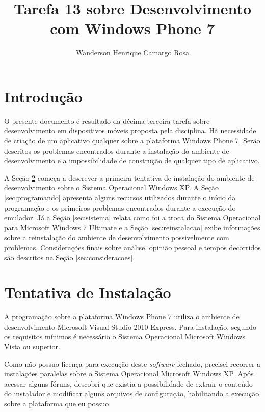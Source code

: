 \documentclass{article}
\title{Tarefa 13 sobre Desenvolvimento com Windows Phone 7}
\author{Wanderson Henrique Camargo Rosa\inst{1}}
\begin{document}
\maketitle{}

\section{Introdução}
\label{sec:introducao}

O presente documento é resultado da décima terceira tarefa sobre desenvolvimento
em dispositivos móveis proposta pela disciplina. Há necessidade de criação de um
aplicativo qualquer sobre a plataforma Windows Phone 7. Serão descritos os
problemas encontrados durante a instalação do ambiente de desenvolvimento e a
impossibilidade de construção de qualquer tipo de aplicativo.

A Seção \ref{sec:tentativa} começa a descrever a primeira tentativa de
instalação do ambiente de desenvolvimento sobre o Sistema Operacional Windows
XP. A Seção \ref{sec:programando} apresenta alguns recursos utilizados durante o
início da programação e os primeiros problemas encontrados durante a execução do
emulador. Já a Seção \ref{sec:sistema} relata como foi a troca do Sistema
Operacional para Microsoft Windows 7 Ultimate e a Seção \ref{sec:reinstalacao}
exibe informações sobre a reinstalação do ambiente de desenvolvimento
possivelmente com problemas. Considerações finais sobre análise, opinião pessoal
e tempos decorridos são descritos na Seção \ref{sec:consideracoes}.

\section{Tentativa de Instalação}
\label{sec:tentativa}

A programação sobre a plataforma Windows Phone 7 utiliza o ambiente de
desenvolvimento Microsoft Visual Studio 2010 Express. Para instalação, segundo
os requisitos mínimos é necessário o Sistema Operacional Microsoft Windows Vista
ou superior.

Como não possuo licença para execução deste \textit{software} fechado, precisei
recorrer a instalações paralelas sobre o Sistema Operacional Microsoft Windows
XP. Após acessar alguns fóruns, descobri que existia a possibilidade de extrair
o conteúdo do instalador e modificar alguns arquivos de configuração,
habilitando a execução sobre a plataforma que eu possuo.
\end{document}

